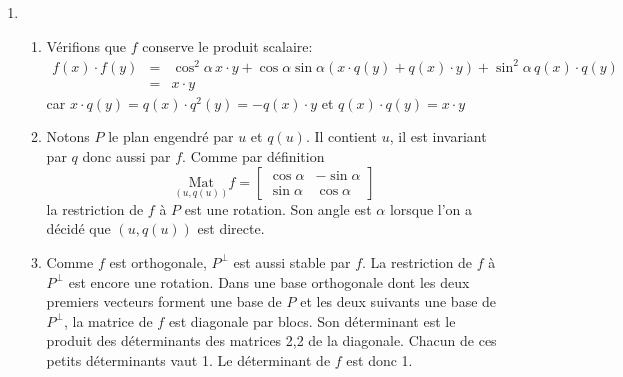 \begin{enumerate}
\item \begin{enumerate}
\item Vérifions que $f$ conserve le produit scalaire:
\begin{eqnarray*}
f(x)\cdot f(y)&=&\cos^{2}\alpha \,x \cdot y + \cos \alpha \sin\alpha(x\cdot q(y) +q(x) \cdot y)+\sin^{2}\alpha \,q(x) \cdot q(y)\\&=& x \cdot y 
\end{eqnarray*}
car $x\cdot q(y)=q(x)\cdot q^{2}(y)=-q(x)\cdot y$ et $q(x)\cdot q(y)=x \cdot y$
\item Notons $P$ le plan engendré par $u$ et $q(u)$. Il contient $u$, il est invariant par $q$ donc aussi par $f$. Comme par définition
\[\underset{(u,q(u))}{\mathrm{Mat}}f=\left [\begin{array}{cc}\cos\alpha & -\sin\alpha\\\sin\alpha & \cos\alpha\end{array}\right ]\]
la restriction de $f$ à $P$ est une rotation. Son angle est $\alpha$ lorsque l'on a décidé que $(u,q(u))$ est directe.
\item Comme $f$ est orthogonale, $P^{\bot}$ est aussi stable par $f$. La restriction de $f$ à $P^{\bot}$ est encore une rotation. Dans une base orthogonale dont les deux premiers vecteurs forment une base de $P$ et les deux suivants une base de $P^{\bot}$, la matrice de $f$ est diagonale par blocs. Son déterminant est le produit des déterminants des matrices 2,2 de la diagonale. Chacun de ces petits déterminants vaut 1. Le déterminant de $f$ est donc 1.
\end{enumerate}
\end{enumerate}


